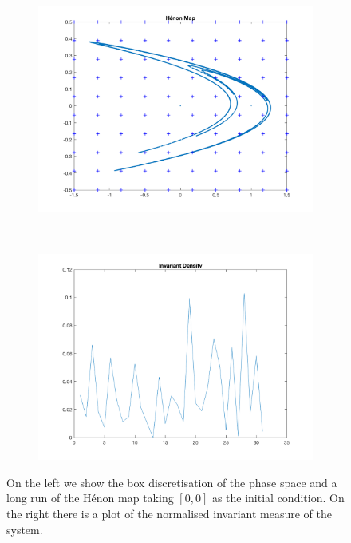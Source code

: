 \begin{figure}[H]
	\centering
	\begin{subfigure}[b]{0.4\textwidth}
		\includegraphics[width=\textwidth]{invarianthenon.png}
		\label{henon0}
	\end{subfigure}
	~ %
	\begin{subfigure}[b]{0.4\textwidth}
		\includegraphics[width=\textwidth]{henonmap.png}
		\label{fig:tiger}
	\end{subfigure}
	\caption{On the left we show the box discretisation of the phase space and a long run of the H\'{e}non map taking $[0,0]$ as the initial condition. On the right there is a plot of the normalised invariant measure of the system.}\label{Henon}
\end{figure}

